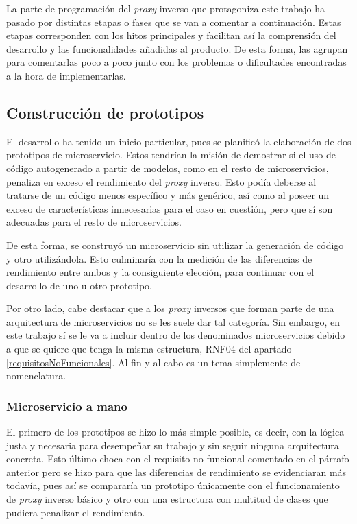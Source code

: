 \documentclass[11pt,spanish,listoffigures]{tfgetsinf}
\begin{document}
La parte de programación del \emph{proxy} inverso que protagoniza este trabajo ha pasado por distintas etapas o fases que se van a comentar a continuación. Estas etapas corresponden con los hitos principales y facilitan así la comprensión del desarrollo y las funcionalidades añadidas al producto. De esta forma, las agrupan para comentarlas poco a poco junto con los problemas o dificultades encontradas a la hora de implementarlas.


		\subsection{Construcción de prototipos}

El desarrollo ha tenido un inicio particular, pues se planificó la elaboración de dos prototipos de microservicio. Estos tendrían la misión de demostrar si el uso de código autogenerado a partir de modelos, como en el resto de microservicios, penaliza en exceso el rendimiento del \emph{proxy} inverso. Esto podía deberse al tratarse de un código menos específico y más genérico, así como al poseer un exceso de características innecesarias para el caso en cuestión, pero que sí son adecuadas para el resto de microservicios.

De esta forma, se construyó un microservicio sin utilizar la generación de código y otro utilizándola. Esto culminaría con la medición de las diferencias de rendimiento entre ambos y la consiguiente elección, para continuar con el desarrollo de uno u otro prototipo.

Por otro lado, cabe destacar que a los \emph{proxy} inversos que forman parte de una arquitectura de microservicios no se les suele dar tal categoría. Sin embargo, en este trabajo sí se le va a incluir dentro de los denominados microservicios debido a que se quiere que tenga la misma estructura, RNF04 del apartado \ref{requisitosNoFuncionales}. Al fin y al cabo es un tema simplemente de nomenclatura.


			\subsubsection{Microservicio a mano}

El primero de los prototipos se hizo lo más simple posible, es decir, con la lógica justa y necesaria para desempeñar su trabajo y sin seguir ninguna arquitectura concreta. Esto último choca con el requisito no funcional comentado en el párrafo anterior pero se hizo para que las diferencias de rendimiento se evidenciaran más todavía, pues así se compararía un prototipo únicamente con el funcionamiento de \emph{proxy} inverso básico y otro con una estructura con multitud de clases que pudiera penalizar el rendimiento.
\end{document}

